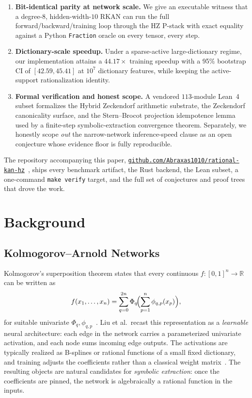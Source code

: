 \documentclass[11pt,a4paper]{article}
\begin{document}
\begin{enumerate}
\item \textbf{Bit-identical parity at network scale.} We give an executable
witness that a degree-$8$, hidden-width-$10$ RKAN can run the full
forward/backward/training loop through the HZ P-stack with exact equality
against a Python \texttt{Fraction} oracle on every tensor, every step.
\item \textbf{Dictionary-scale speedup.} Under a sparse-active large-dictionary
regime, our implementation attains a $44.17{\times}$ training speedup with
a 95\% bootstrap CI of $[42.59, 45.41]$ at $10^{7}$ dictionary features,
while keeping the active-support rationalization identity.
\item \textbf{Formal verification and honest scope.} A vendored $113$-module
Lean~4 subset formalizes the Hybrid Zeckendorf arithmetic substrate, the
Zeckendorf canonicality surface, and the Stern--Brocot projection
idempotence lemma used by a finite-step symbolic-extraction convergence
theorem. Separately, we honestly scope \emph{out} the narrow-network
inference-speed clause as an open conjecture whose evidence floor is fully
reproducible.
\end{enumerate}

The repository accompanying this paper,
\href{https://github.com/Abraxas1010/rational-kan-hz}{\texttt{github.com/Abraxas1010/rational-kan-hz}}~\cite{apoth3osis_rkan_hz_2026},
ships every benchmark artifact, the Rust backend, the Lean subset, a
one-command \texttt{make verify} target, and the full set of conjectures and
proof trees that drove the work.

\section{Background}
\label{sec:background}

\subsection{Kolmogorov--Arnold Networks}

Kolmogorov's superposition theorem states that every continuous
$f \colon [0,1]^{n} \to \mathbb{R}$ can be written as
\begin{equation}
f(x_{1},\ldots,x_{n})
= \sum_{q=0}^{2n} \Phi_{q}\!\Bigl(\sum_{p=1}^{n} \phi_{q,p}(x_{p})\Bigr),
\label{eq:kolmogorov}
\end{equation}
for suitable univariate $\Phi_{q},\phi_{q,p}$~\cite{kolmogorov1957,arnold1959}.
Liu et al.\ recast this representation as a \emph{learnable} neural
architecture: each edge in the network carries a parameterized univariate
activation, and each node sums incoming edge outputs. The activations are
typically realized as B-splines or rational functions of a small fixed
dictionary, and training adjusts the coefficients rather than a classical
weight matrix~\cite{liu2024kan}. The resulting objects are natural candidates
for \emph{symbolic extraction}: once the coefficients are pinned, the network
is algebraically a rational function in the inputs.
\end{document}
